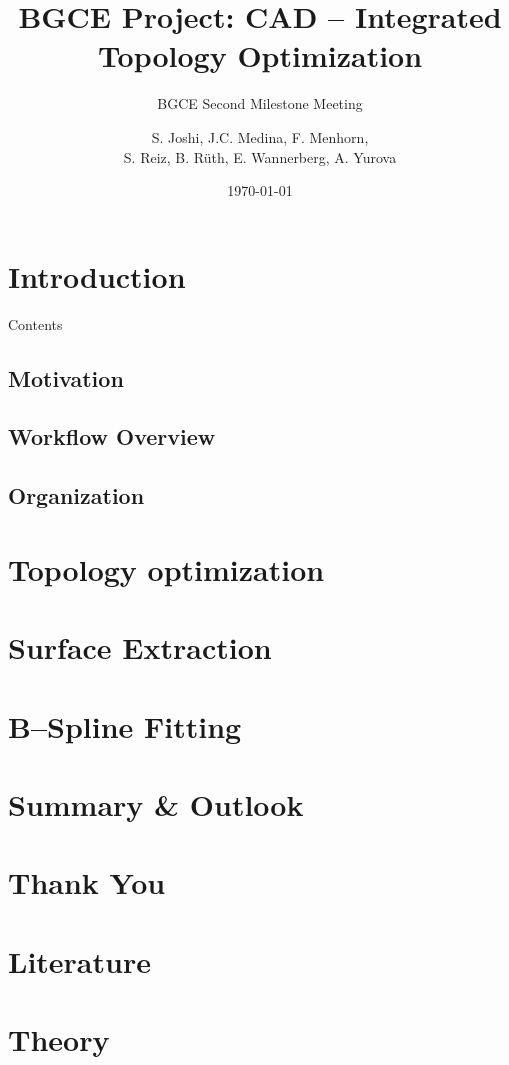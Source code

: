 \documentclass[9pt,pdftex]{beamer}
\title{BGCE Project: CAD -- Integrated Topology Optimization}
\subtitle{BGCE Second Milestone Meeting}
\author[J.C. Medina, F. Menhorn, A. Yurova] {
S. Joshi, J.C. Medina, F. Menhorn, 
\\
S. Reiz, B. Rüth, E. Wannerberg, A. Yurova} %
\date{\today}
\institute{Technische Universität München}
\begin{document}
\frame{\maketitle}

\section{Introduction}
\begin{frame}{Contents}
\tableofcontents
\end{frame}

\subsection{Motivation}


\subsection{Workflow Overview}


\subsection{Organization}



\section{Topology optimization}


%
\section{Surface Extraction}



\section{B--Spline Fitting}

\section{Summary \& Outlook}

\section*{Thank You}

\section*{Literature}

\section*{Theory}

\end{document}
